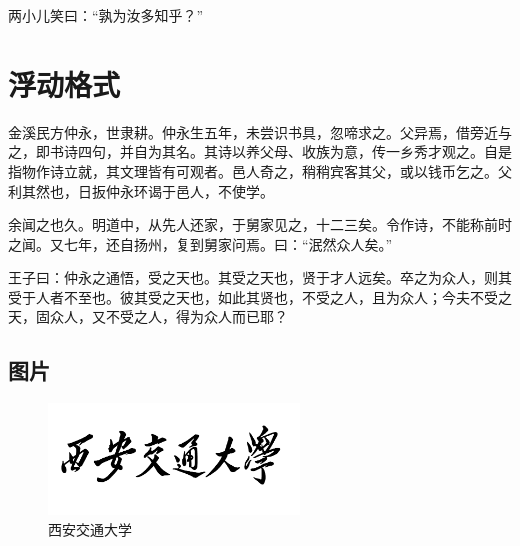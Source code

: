 \documentclass[
    bachelor, 
    ]{xjtuthesis}
\begin{document}
                    两小儿笑曰：“孰为汝多知乎？”

    \chapter{浮动格式}

        金溪民方仲永，世隶耕。仲永生五年，未尝识书具，忽啼求之。父异焉，借旁近与之，即书诗四句，并自为其名。其诗以养父母、收族为意，传一乡秀才观之。自是指物作诗立就，其文理皆有可观者。邑人奇之，稍稍宾客其父，或以钱币乞之。父利其然也，日扳仲永环谒于邑人，不使学。

        余闻之也久。明道中，从先人还家，于舅家见之，十二三矣。令作诗，不能称前时之闻。又七年，还自扬州，复到舅家问焉。曰：“泯然众人矣。”

        王子曰：仲永之通悟，受之天也。其受之天也，贤于才人远矣。卒之为众人，则其受于人者不至也。彼其受之天也，如此其贤也，不受之人，且为众人；今夫不受之天，固众人，又不受之人，得为众人而已耶？

        \section{图片}

            \begin{figure}[h!]
              \centering
              \includegraphics[width=6.67cm]{XJTU.pdf}
              \caption{西安交通大学}
              \label{fig:xjtu}
            \end{figure}
 
\end{document}
